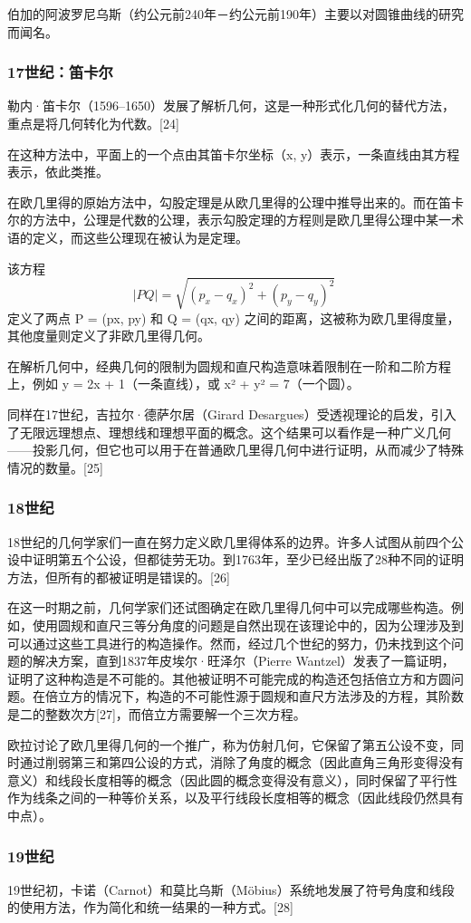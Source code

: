 伯加的阿波罗尼乌斯（约公元前240年－约公元前190年）主要以对圆锥曲线的研究而闻名。
\subsubsection{17世纪：笛卡尔} 
勒内·笛卡尔（1596–1650）发展了解析几何，这是一种形式化几何的替代方法，重点是将几何转化为代数。[24]

在这种方法中，平面上的一个点由其笛卡尔坐标（x, y）表示，一条直线由其方程表示，依此类推。

在欧几里得的原始方法中，勾股定理是从欧几里得的公理中推导出来的。而在笛卡尔的方法中，公理是代数的公理，表示勾股定理的方程则是欧几里得公理中某一术语的定义，而这些公理现在被认为是定理。

该方程
\[
|PQ| = \sqrt{(p_x - q_x)^2 + (p_y - q_y)^2}~
\]
定义了两点 P = (px, py) 和 Q = (qx, qy) 之间的距离，这被称为欧几里得度量，其他度量则定义了非欧几里得几何。

在解析几何中，经典几何的限制为圆规和直尺构造意味着限制在一阶和二阶方程上，例如 y = 2x + 1（一条直线），或 x² + y² = 7（一个圆）。

同样在17世纪，吉拉尔·德萨尔居（Girard Desargues）受透视理论的启发，引入了无限远理想点、理想线和理想平面的概念。这个结果可以看作是一种广义几何——投影几何，但它也可以用于在普通欧几里得几何中进行证明，从而减少了特殊情况的数量。[25]
\subsubsection{18世纪}  
18世纪的几何学家们一直在努力定义欧几里得体系的边界。许多人试图从前四个公设中证明第五个公设，但都徒劳无功。到1763年，至少已经出版了28种不同的证明方法，但所有的都被证明是错误的。[26]

在这一时期之前，几何学家们还试图确定在欧几里得几何中可以完成哪些构造。例如，使用圆规和直尺三等分角度的问题是自然出现在该理论中的，因为公理涉及到可以通过这些工具进行的构造操作。然而，经过几个世纪的努力，仍未找到这个问题的解决方案，直到1837年皮埃尔·旺泽尔（Pierre Wantzel）发表了一篇证明，证明了这种构造是不可能的。其他被证明不可能完成的构造还包括倍立方和方圆问题。在倍立方的情况下，构造的不可能性源于圆规和直尺方法涉及的方程，其阶数是二的整数次方[27]，而倍立方需要解一个三次方程。

欧拉讨论了欧几里得几何的一个推广，称为仿射几何，它保留了第五公设不变，同时通过削弱第三和第四公设的方式，消除了角度的概念（因此直角三角形变得没有意义）和线段长度相等的概念（因此圆的概念变得没有意义），同时保留了平行性作为线条之间的一种等价关系，以及平行线段长度相等的概念（因此线段仍然具有中点）。
\subsubsection{19世纪}
19世纪初，卡诺（Carnot）和莫比乌斯（Möbius）系统地发展了符号角度和线段的使用方法，作为简化和统一结果的一种方式。[28]

